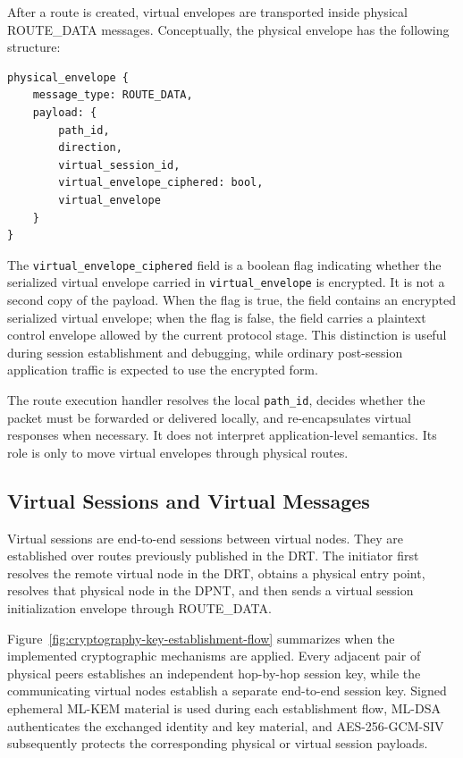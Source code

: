 \documentclass[12pt,a4paper]{article}
\newcommand{\codebreak}[1]{{\footnotesize\ttfamily #1}}
\begin{document}
After a route is created, virtual envelopes are transported inside physical \codebreak{ROUTE\_\allowbreak{}DATA} messages. Conceptually, the physical envelope has the following structure:

\begin{verbatim}
physical_envelope {
    message_type: ROUTE_DATA,
    payload: {
        path_id,
        direction,
        virtual_session_id,
        virtual_envelope_ciphered: bool,
        virtual_envelope
    }
}
\end{verbatim}

The \texttt{virtual\_envelope\_ciphered} field is a boolean flag indicating whether the serialized virtual envelope carried in \texttt{virtual\_envelope} is encrypted. It is not a second copy of the payload. When the flag is true, the field contains an encrypted serialized virtual envelope; when the flag is false, the field carries a plaintext control envelope allowed by the current protocol stage. This distinction is useful during session establishment and debugging, while ordinary post-session application traffic is expected to use the encrypted form.

The route execution handler resolves the local \texttt{path\_id}, decides whether the packet must be forwarded or delivered locally, and re-encapsulates virtual responses when necessary. It does not interpret application-level semantics. Its role is only to move virtual envelopes through physical routes.

\subsection{Virtual Sessions and Virtual Messages}
\label{sec:virtual-sessions-messages}

Virtual sessions are end-to-end sessions between virtual nodes. They are established over routes previously published in the DRT. The initiator first resolves the remote virtual node in the DRT, obtains a physical entry point, resolves that physical node in the DPNT, and then sends a virtual session initialization envelope through \codebreak{ROUTE\_\allowbreak{}DATA}.

Figure~\ref{fig:cryptography-key-establishment-flow} summarizes when the implemented cryptographic mechanisms are applied. Every adjacent pair of physical peers establishes an independent hop-by-hop session key, while the communicating virtual nodes establish a separate end-to-end session key. Signed ephemeral ML-KEM material is used during each establishment flow, ML-DSA authenticates the exchanged identity and key material, and AES-256-GCM-SIV subsequently protects the corresponding physical or virtual session payloads.
\end{document}

